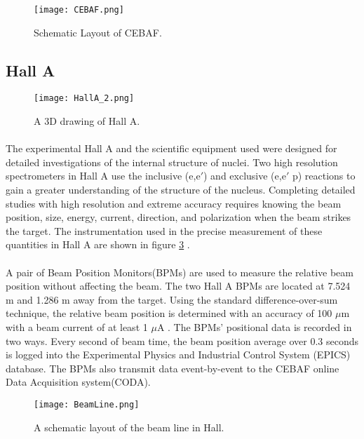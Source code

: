 	\begin{figure}[h]
	\centering
	 \caption{Schematic Layout of CEBAF. }
	 \label{CEBAF}
	 \texttt{[image: CEBAF.png]} 
	 \end{figure} 
	 
	 \subsection{Hall A}
	 
	\begin{figure}[H]
		\centering
		\caption{A 3D drawing of Hall A. }
		\label{HallA}
		\texttt{[image: HallA\_2.png]} 
	\end{figure} 	 
	 
	 \paragraph{}The experimental Hall A and the scientific equipment used were designed for detailed investigations of the internal structure of nuclei. Two high resolution spectrometers in Hall A use the inclusive (e,e$\prime$) and exclusive (e,e$\prime$ p) reactions to gain a greater understanding of the structure of the nucleus. Completing detailed studies with high resolution and extreme accuracy requires knowing the beam position, size, energy, current, direction, and polarization when the beam strikes the target. The instrumentation used in the precise measurement of these quantities in Hall A  are shown in figure \ref{BeamLine} \cite{HallA}.

	 \paragraph{} A pair of Beam Position Monitors(BPMs) are used to measure the relative beam position without affecting the beam. The two Hall A BPMs are located at 7.524 m and 1.286 m away from the target. Using the standard difference-over-sum technique, the relative beam position is determined with an accuracy of 100 $\mu$m with a beam current of at least 1 $\mu$A \cite{HallA}. The BPMs' positional data is recorded in two ways. Every second of beam time, the beam position average over 0.3 seconds is logged into the Experimental Physics and Industrial Control System (EPICS) database. The BPMs also transmit data event-by-event to the CEBAF online Data Acquisition system(CODA).
	 	 	 
 	 	\begin{figure}[H]
 	 		\centering
 	 		\caption{A schematic layout of the beam line in Hall. \cite{HallA} }
	 	 	\label{BeamLine}
	 	 	\texttt{[image: BeamLine.png]} 
	 	 \end{figure} 	
	 	 	
